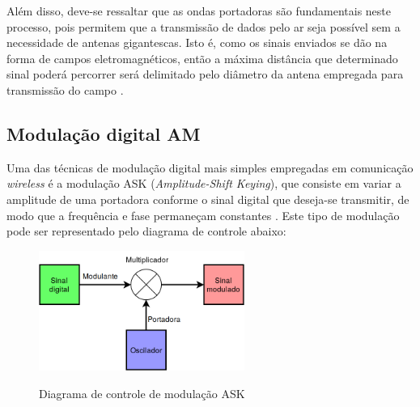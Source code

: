 \documentclass[oneside,openright,12pt]{ufsm_2015} %
\begin{document}
Além disso, deve-se ressaltar que as ondas portadoras são fundamentais neste processo, pois permitem que a transmissão de dados pelo ar seja possível sem a necessidade de antenas gigantescas. Isto é, como os sinais enviados se dão na forma de campos eletromagnéticos, então a máxima distância que determinado sinal poderá percorrer será delimitado pelo diâmetro da antena empregada para transmissão do campo \cite{book:1681103}.

\subsection{Modulação digital AM}
Uma das técnicas de modulação digital mais simples empregadas em comunicação \textit{wireless} é a modulação ASK (\textit{Amplitude-Shift Keying}), que consiste em variar a amplitude de uma portadora conforme o sinal digital que deseja-se transmitir, de modo que a frequência e fase permaneçam constantes \cite{book:1039396}. Este tipo de modulação pode ser representado pelo diagrama de controle abaixo:
\begin{figure}[ht]
     \caption{\label{exepretex} Diagrama de controle de modulação ASK}
\centering
\includegraphics[width=0.6\textwidth]{figuras/ask-control.png}
\vspace{\baselineskip} %
    \label{fig:ask-control}
\end{figure}
\end{document}
